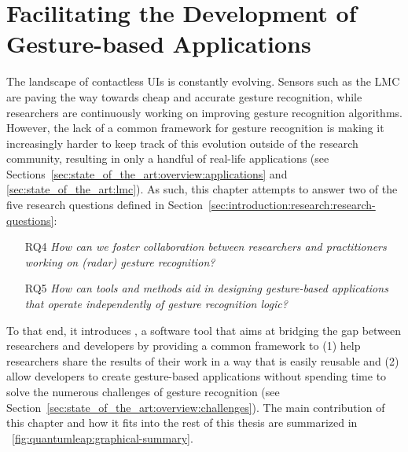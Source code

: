 \chapter{Facilitating the Development of Gesture-based Applications} \label{chap:quantumleap}

The landscape of contactless UIs is constantly evolving. Sensors such as the LMC are paving the way towards cheap and accurate gesture recognition, while researchers are continuously working on improving gesture recognition algorithms.
However, the lack of a common framework for gesture recognition is making it increasingly harder to keep track of this evolution outside of the research community, resulting in only a handful of real-life applications (see Sections~\ref{sec:state_of_the_art:overview:applications} and \ref{sec:state_of_the_art:lmc}). 
%
As such, this chapter attempts to answer two of the five research questions defined in Section~\ref{sec:introduction:research:research-questions}: 
\begin{itemize}
    \item [RQ4] \textit{How can we foster collaboration between researchers and practitioners working on (radar) gesture recognition?} 
    \item [RQ5] \textit{How can tools and methods aid in designing gesture-based applications that operate independently of gesture recognition logic?}
\end{itemize}
To that end, it introduces \ql, a software tool that aims at bridging the gap between researchers and developers by providing a common framework to (1) help researchers share the results of their work in a way that is easily reusable and (2) allow developers to create gesture-based applications without spending time to solve the numerous challenges of gesture recognition (see Section~\ref{sec:state_of_the_art:overview:challenges}). The main contribution of this chapter and how it fits into the rest of this thesis are summarized in \fig~\ref{fig:quantumleap:graphical-summary}.

